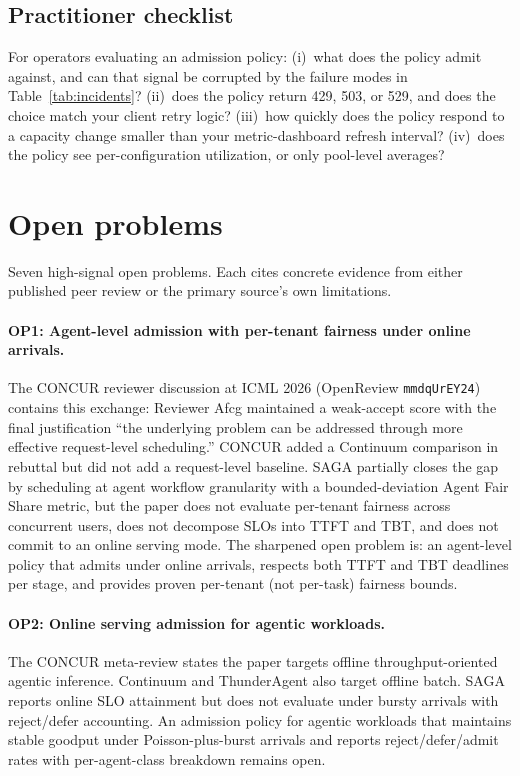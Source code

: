 \documentclass[10pt]{article} %
\theoremstyle{definition}
\begin{document}
\subsection{Practitioner checklist}

For operators evaluating an admission policy: (i)~what does the policy
admit against, and can that signal be corrupted by the failure modes
in Table~\ref{tab:incidents}? (ii)~does the policy return 429, 503, or
529, and does the choice match your client retry logic? (iii)~how
quickly does the policy respond to a capacity change smaller than your
metric-dashboard refresh interval? (iv)~does the policy see
per-configuration utilization, or only pool-level averages?

\section{Open problems}
\label{sec:open}

Seven high-signal open problems. Each cites concrete evidence from
either published peer review or the primary source's own limitations.

\paragraph{OP1: Agent-level admission with per-tenant fairness under online arrivals.}
The CONCUR reviewer discussion at ICML 2026 (OpenReview
\texttt{mmdqUrEY24}) contains this exchange: Reviewer Afcg maintained
a weak-accept score with the final justification ``the underlying
problem can be addressed through more effective request-level
scheduling.'' CONCUR added a Continuum comparison in rebuttal but did
not add a request-level baseline. SAGA
\citep{guo2026saga} partially closes the gap by scheduling at agent
workflow granularity with a bounded-deviation Agent Fair Share
metric, but the paper does not evaluate per-tenant fairness across
concurrent users, does not decompose SLOs into TTFT and TBT, and
does not commit to an online serving mode. The sharpened open
problem is: an agent-level policy that admits under online arrivals,
respects both TTFT and TBT deadlines per stage, and provides
proven per-tenant (not per-task) fairness bounds.

\paragraph{OP2: Online serving admission for agentic workloads.}
The CONCUR meta-review states the paper targets offline
throughput-oriented agentic inference. Continuum and ThunderAgent
also target offline batch. SAGA reports online SLO attainment but
does not evaluate under bursty arrivals with reject/defer accounting.
An admission policy for agentic workloads that maintains stable
goodput under Poisson-plus-burst arrivals and reports
reject/defer/admit rates with per-agent-class breakdown remains
open.
\end{document}
